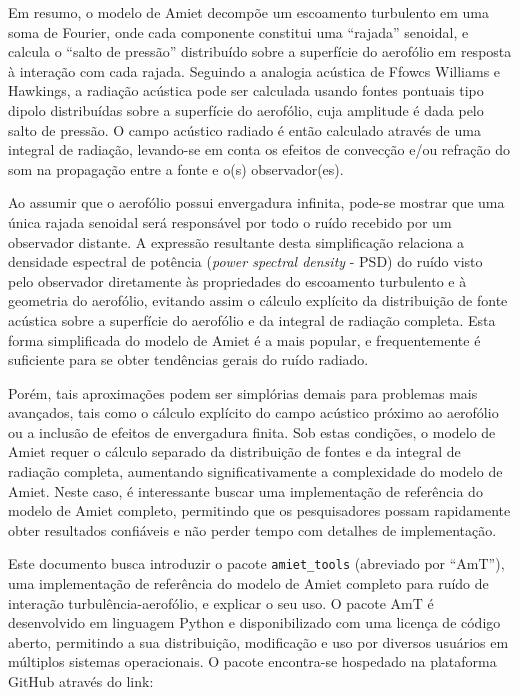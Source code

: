 \documentclass[a4paper, 11pt, twoside]{article}
\begin{document}
Em resumo, o modelo de Amiet decompõe um escoamento turbulento em uma soma de Fourier, onde cada componente constitui uma ``rajada'' senoidal, e calcula o ``salto de pressão'' distribuído sobre a superfície do aerofólio em resposta à interação com cada rajada. Seguindo a analogia acústica de Ffowcs Williams e Hawkings, a radiação acústica pode ser calculada usando fontes pontuais tipo dipolo distribuídas sobre a superfície do aerofólio, cuja amplitude é dada pelo salto de pressão. O campo acústico radiado é então calculado através de uma integral de radiação, levando-se em conta os efeitos de convecção e/ou refração do som na propagação entre a fonte e o(s) observador(es).

Ao assumir que o aerofólio possui envergadura infinita, pode-se mostrar que uma única rajada senoidal será responsável por todo o ruído recebido por um observador distante. A expressão resultante desta simplificação relaciona a densidade espectral de potência (\emph{power spectral density} - PSD) do ruído visto pelo observador diretamente às propriedades do escoamento turbulento e à geometria do aerofólio, evitando assim o cálculo explícito da distribuição de fonte acústica sobre a superfície do aerofólio e da integral de radiação completa. Esta forma simplificada do modelo de Amiet é a mais popular, e frequentemente é suficiente para se obter tendências gerais do ruído radiado. 

Porém, tais aproximações podem ser simplórias demais para problemas mais avançados, tais como o cálculo explícito do campo acústico próximo ao aerofólio ou a inclusão de efeitos de envergadura finita. Sob estas condições, o modelo de Amiet requer o cálculo separado da distribuição de fontes e da integral de radiação completa, aumentando significativamente a complexidade do modelo de Amiet. Neste caso, é interessante buscar uma implementação de referência do modelo de Amiet completo, permitindo que os pesquisadores possam rapidamente obter resultados confiáveis e não perder tempo com detalhes de implementação.

Este documento busca introduzir o pacote \verb|amiet_tools| (abreviado por ``AmT''), uma implementação de referência do modelo de Amiet completo para ruído de interação turbulência-aerofólio, e explicar o seu uso. O pacote AmT é desenvolvido em linguagem Python e disponibilizado com uma licença de código aberto, permitindo a sua distribuição, modificação e uso por diversos usuários em múltiplos sistemas operacionais. O pacote encontra-se hospedado na plataforma GitHub através do link:
\end{document}
